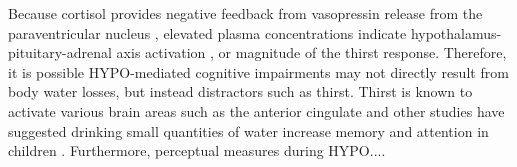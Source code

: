 Because cortisol provides negative feedback from vasopressin release from the paraventricular nucleus \cite{andreoli_endocrine_2010}, elevated plasma concentrations indicate hypothalamus-pituitary-adrenal axis activation \cite{lieberman_severe_2005}, or magnitude of the thirst response. Therefore, it is possible HYPO-mediated cognitive impairments may not directly result from body water losses, but instead distractors such as thirst. Thirst is known to activate various brain areas such as the anterior cingulate \cite{saker_regional_2014} and other studies have suggested drinking small quantities of water increase memory and attention in children \cite{benton_effect_2009}. Furthermore, perceptual measures during HYPO....


 